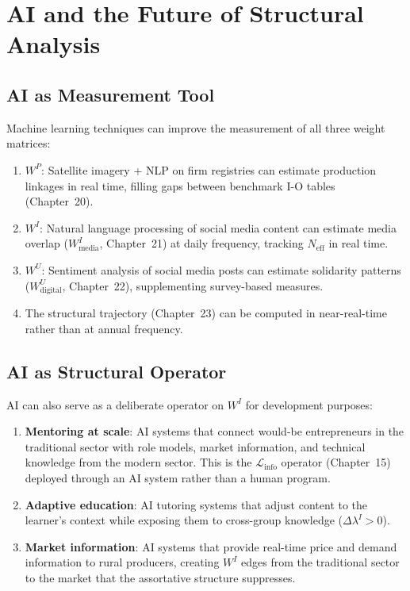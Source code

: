 \documentclass[../structural_economics_book.tex]{subfiles}
\begin{document}
\section{AI and the Future of Structural Analysis}
\label{ch27:sec:future}

\subsection{AI as Measurement Tool}

\begin{remark}\label{ch27:prop:ai_measurement}
Machine learning techniques can improve the measurement of all three weight matrices:
\begin{enumerate}
\item $W^P$: Satellite imagery + NLP on firm registries can estimate production linkages in real time, filling gaps between benchmark I-O tables (Chapter~20).
\item $W^I$: Natural language processing of social media content can estimate media overlap ($W^I_{\text{media}}$, Chapter~21) at daily frequency, tracking $N_{\text{eff}}$ in real time.
\item $W^U$: Sentiment analysis of social media posts can estimate solidarity patterns ($W^U_{\text{digital}}$, Chapter~22), supplementing survey-based measures.
\item The structural trajectory (Chapter~23) can be computed in near-real-time rather than at annual frequency.
\end{enumerate}
\end{remark}


\subsection{AI as Structural Operator}

\begin{remark}\label{ch27:prop:ai_operator}
AI can also serve as a deliberate operator on $W^I$ for development purposes:
\begin{enumerate}
\item \textbf{Mentoring at scale}: AI systems that connect would-be entrepreneurs in the traditional sector with role models, market information, and technical knowledge from the modern sector. This is the $\mathcal{L}_{\text{info}}$ operator (Chapter~15) deployed through an AI system rather than a human program.
\item \textbf{Adaptive education}: AI tutoring systems that adjust content to the learner's context while exposing them to cross-group knowledge ($\Delta\lambda^I > 0$).
\item \textbf{Market information}: AI systems that provide real-time price and demand information to rural producers, creating $W^I$ edges from the traditional sector to the market that the assortative structure suppresses.
\end{enumerate}
\end{remark}
\end{document}
